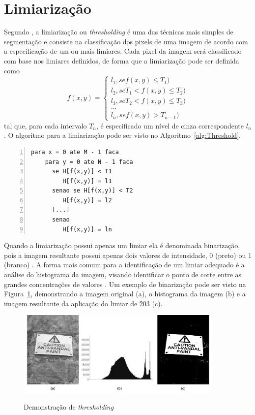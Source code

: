 \documentclass[12pt,oneside,a4paper,english,french,spanish,brazil,]{abntex2}
\begin{document}
\section{Limiarização}

Segundo \citet{pedrini:2008}, a limiarização ou \textit{thresholding} é uma das técnicas mais simples de segmentação e consiste na classificação dos pixels de uma imagem de acordo com a especificação de um ou mais limiares. Cada pixel da imagem será classificado com base nos limiares definidos, de forma que a limiarização pode ser definida como \[f(x,y)=\left\{\begin{matrix} l_1, se f(x,y) \leq T_1) \\ l_2, se T_1 < f(x,y) \leq T_2)\\ l_3, se T_2 < f(x,y) \leq T_3)\\ ...\\ l_n, se f(x,y) > T_{n-1}) \end{matrix}\right.\] tal que, para cada intervalo \(T_n\), é especificado um nível de cinza correspondente \(l_n\). O algoritmo para a limiarização pode ser visto no Algoritmo~\ref{alg:Threshold}.

\begin{minipage}{\linewidth}
\begin{lstlisting}[caption={Algoritmo para limiarização}, label=alg:Threshold, numbers=left]
para x = 0 ate M - 1 faca
    para y = 0 ate N - 1 faca
      se H[f(x,y)] < T1
         H[f(x,y)] = l1
      senao se H[f(x,y)] < T2
         H[f(x,y)] = l2
      [...]
      senao 
         H[f(x,y)] = ln
\end{lstlisting}
\end{minipage}

Quando a limiarização possui apenas um limiar ela é denominada binarização, pois a imagem resultante possui apenas dois valores de intensidade, 0 (preto) ou 1 (branco) \cite{pedrini:2008}. A forma mais comum para a identificação de um limiar adequado é a análise do histograma da imagem, visando identificar o ponto de corte entre as grandes concentrações de valores \cite{gonzalez:2012}. Um exemplo de binarização pode ser visto na Figura~\ref{fig:PDI_Limiarizacao}, demonstrando a imagem original (a), o histograma da imagem (b) e a imagem resultante da aplicação do limiar de  203 (c).

\begin{figure}[ht]
\centering
\caption{ Demonstração de \textit{thresholding}}
\includegraphics[width=0.9\textwidth]{imagens/PDI_Limiarizacao.pdf}
\sourceAuthor
\label{fig:PDI_Limiarizacao}
\end{figure}
\end{document}
